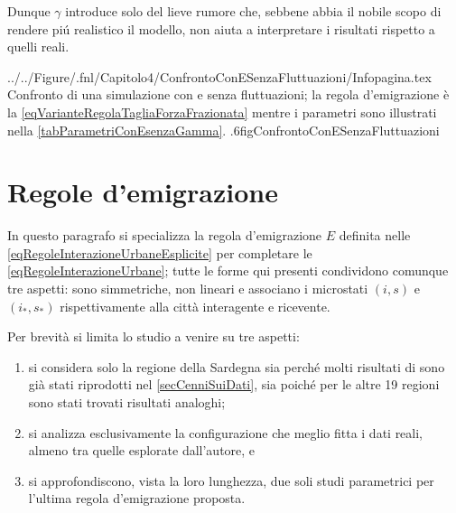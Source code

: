             Dunque \(\gamma\) introduce solo del lieve rumore che, sebbene abbia il nobile scopo di rendere piú realistico il modello, non aiuta a interpretare i risultati rispetto a quelli reali.

                {../../Figure/.fnl/Capitolo4/ConfrontoConESenzaFluttuazioni/Infopagina.tex}
                {Confronto di una simulazione con e senza fluttuazioni; la regola d'emigrazione è la \cref{eqVarianteRegolaTagliaForzaFrazionata} mentre i parametri sono illustrati nella \cref{tabParametriConEsenzaGamma}.}
                {.6\linewidth}{figConfrontoConESenzaFluttuazioni}

    \section{Regole d'emigrazione}\label{secRegoleEmigrazione}

        In questo paragrafo si specializza la regola d'emigrazione \(E\) definita nelle \ref{eqRegoleInterazioneUrbaneEsplicite} per completare le \ref{eqRegoleInterazioneUrbane}; tutte le forme qui presenti condividono comunque tre aspetti: sono simmetriche, non lineari e associano i microstati \((i,s)\) e \((i_*,s_*)\) rispettivamente alla città interagente e ricevente.

        Per brevità si limita lo studio a venire su tre aspetti:

        \begin{enumerate}[
            label=\arabic*.,
        ]
            \item si considera solo la regione della Sardegna sia perché molti risultati di \cite{DeMontis2007} sono già stati riprodotti nel \cref{secCenniSuiDati}, sia poiché per le altre 19 regioni sono stati trovati risultati analoghi;
            \item si analizza esclusivamente la configurazione che meglio fitta i dati reali, almeno tra quelle esplorate dall'autore, e
            \item si approfondiscono, vista la loro lunghezza, due soli studi parametrici per l'ultima regola d'emigrazione proposta.
        \end{enumerate}
       
